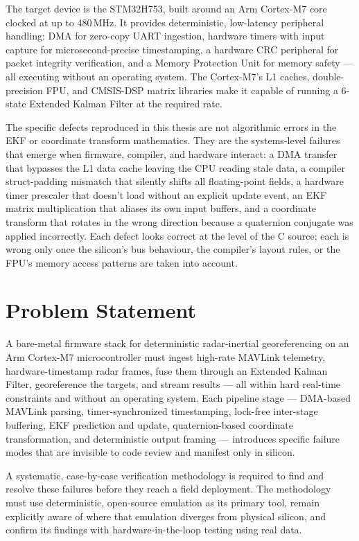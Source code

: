 The target device is the STM32H753, built around an Arm Cortex-M7 core clocked at up to 480\,MHz. It provides deterministic, low-latency peripheral handling: DMA for zero-copy UART ingestion, hardware timers with input capture for microsecond-precise timestamping, a hardware CRC peripheral for packet integrity verification, and a Memory Protection Unit for memory safety --- all executing without an operating system. The Cortex-M7's L1 caches, double-precision FPU, and CMSIS-DSP matrix libraries make it capable of running a 6-state Extended Kalman Filter at the required rate.

The specific defects reproduced in this thesis are not algorithmic errors in the EKF or coordinate transform mathematics. They are the systems-level failures that emerge when firmware, compiler, and hardware interact: a DMA transfer that bypasses the L1 data cache leaving the CPU reading stale data, a compiler struct-padding mismatch that silently shifts all floating-point fields, a hardware timer prescaler that doesn't load without an explicit update event, an EKF matrix multiplication that aliases its own input buffers, and a coordinate transform that rotates in the wrong direction because a quaternion conjugate was applied incorrectly. Each defect looks correct at the level of the C source; each is wrong only once the silicon's bus behaviour, the compiler's layout rules, or the FPU's memory access patterns are taken into account.

\section{Problem Statement}

A bare-metal firmware stack for deterministic radar-inertial georeferencing on an Arm Cortex-M7 microcontroller must ingest high-rate MAVLink telemetry, hardware-timestamp radar frames, fuse them through an Extended Kalman Filter, georeference the targets, and stream results --- all within hard real-time constraints and without an operating system. Each pipeline stage --- DMA-based MAVLink parsing, timer-synchronized timestamping, lock-free inter-stage buffering, EKF prediction and update, quaternion-based coordinate transformation, and deterministic output framing --- introduces specific failure modes that are invisible to code review and manifest only in silicon.

A systematic, case-by-case verification methodology is required to find and resolve these failures before they reach a field deployment. The methodology must use deterministic, open-source emulation as its primary tool, remain explicitly aware of where that emulation diverges from physical silicon, and confirm its findings with hardware-in-the-loop testing using real data.

